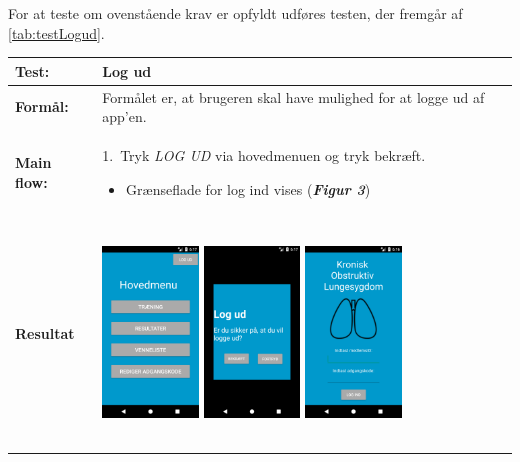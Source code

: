 \noindent
For at teste om ovenstående krav er opfyldt udføres testen, der fremgår af \autoref{tab:testLogud}.

  \begin{longtable}{ | l | p{13cm} |} \hline
    \textbf{Test:} & Log ud \\ \hline
  \textbf{Formål:} & Formålet er, at brugeren skal have mulighed for at logge ud af app’en.
 \\ \hline
 	\textbf{Main flow:} & 1.~Tryk \textit{LOG UD} via hovedmenuen og tryk bekræft.
 	\begin{itemize}
 	\item Grænseflade for log ind vises  (\textbf{\textit{Figur 3}})
 	\end{itemize}	
\\ \hline
\textbf{Resultat} &  \hspace{1.5mm}  \raisebox{-\totalheight}    {\includegraphics[width=0.24\textwidth, height=60mm]{figures/test/logud2}} 
\hspace{5mm}
        \raisebox{-\totalheight}
    {\includegraphics[width=0.24\textwidth, height=60mm]{figures/test/logud3}} 
    \hspace{5mm}
        \raisebox{-\totalheight}
    {\includegraphics[width=0.24\textwidth, height=60mm]{figures/test/logud1}} \vspace{3mm}

\end{longtable}

